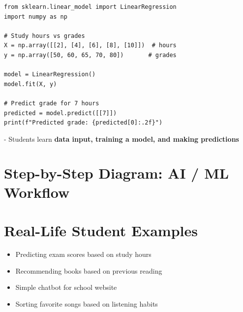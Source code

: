 \begin{verbatim}
from sklearn.linear_model import LinearRegression
import numpy as np

# Study hours vs grades
X = np.array([[2], [4], [6], [8], [10]])  # hours
y = np.array([50, 60, 65, 70, 80])       # grades

model = LinearRegression()
model.fit(X, y)

# Predict grade for 7 hours
predicted = model.predict([[7]])
print(f"Predicted grade: {predicted[0]:.2f}")
\end{verbatim}

- Students learn \textbf{data input, training a model, and making predictions}  

\section{Step-by-Step Diagram: AI / ML Workflow}

\begin{center}
\end{center}

\section{Real-Life Student Examples}

\begin{itemize}
    \item Predicting exam scores based on study hours  
    \item Recommending books based on previous reading  
    \item Simple chatbot for school website  
    \item Sorting favorite songs based on listening habits  
\end{itemize}

